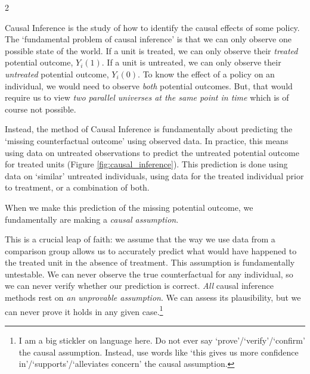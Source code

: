 \documentclass[12pt]{article}
\begin{document}
\begin{multicols}{2}
\begin{figure*}[!tb]

\caption{Potential Outcomes and Causal Inference}\label{fig:causal_inference}
\end{figure*}

Causal Inference is the study of how to identify the causal effects of some policy.
The `fundamental problem of causal inference' is that we can only observe one possible state of the world. 
If a unit is treated, we can only observe their \emph{treated} potential outcome, $Y_i(1)$.
If a unit is untreated, we can only observe their \emph{untreated} potential outcome, $Y_i(0)$.
To know the effect of a policy on an individual, we would need to observe \emph{both} potential outcomes. 
But, that would require us to view \emph{two parallel universes at the same point in time} which is of course not possible.

Instead, the method of Causal Inference is fundamentally about predicting the `missing counterfactual outcome' using observed data. 
In practice, this means using data on untreated observations to predict the untreated potential outcome for treated units (Figure \ref{fig:causal_inference}). 
This prediction is done using data on `similar' untreated individuals, using data for the treated individual prior to treatment, or a combination of both.



When we make this prediction of the missing potential outcome, we fundamentally are making a \emph{causal assumption}. 

This is a crucial leap of faith: we assume that the way we use data from a comparison group allows us to accurately predict what would have happened to the treated unit in the absence of treatment. 
This assumption is fundamentally untestable.
We can never observe the true counterfactual for any individual, so we can never verify whether our prediction is correct. 
\emph{All} causal inference methods rest on \emph{an unprovable assumption}.
We can assess its plausibility, but we can never prove it holds in any given case.\footnote{
  I am a big stickler on language here. 
  Do not ever say `prove'/`verify'/`confirm' the causal assumption.
  Instead, use words like `this gives us more confidence in'/`supports'/`alleviates concern' the causal assumption.
}



\end{multicols}
\end{document}
